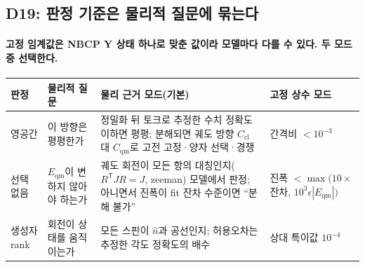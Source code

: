 \subsection{D19: 판정 기준은 물리적 질문에 묶는다}\label{state-selection-criteria}
\begingroup%
  \framesubtitle{고정 임계값은 NBCP Y 상태 하나로 맞춘 값이라 모델마다 다를 수 있다. 두 모드 중 선택한다.}
  \small
  \begin{tabularx}{\textwidth}{@{}P{2.0cm}P{3.2cm}YP{2.9cm}@{}}
    \toprule
    판정 & 물리적 질문 & 물리 근거 모드(기본) & 고정 상수 모드 \\
    \midrule
    영공간 & 이 방향은 평평한가 & 정밀화 뒤 토크로 추정한 수치 정확도 이하면 평평; 분해되면 궤도 방향 $C_{\mathrm{cl}}$ 대 $C_{\mathrm{qm}}$로 고전 고정·양자 선택·경쟁 & 간격비 $<10^{-3}$ \\
    선택 없음 & $E_{\mathrm{qm}}$이 변하지 않아야 하는가 & 궤도 회전이 모든 항의 대칭인지($R^{\mathsf T}JR=J$, zeeman) 모델에서 판정; 아니면서 진폭이 fit 잔차 수준이면 ``분해 불가'' & 진폭 $<\max(10\times$잔차$,\,10^3\epsilon|E_{\mathrm{qm}}|)$ \\
    생성자 rank & 회전이 상태를 움직이는가 & 모든 스핀이 $\hat n$과 공선인지; 허용오차는 추정한 각도 정확도의 배수 & 상대 특이값 $10^{-4}$ \\
    \bottomrule
  \end{tabularx}
  \par\medskip
\endgroup


